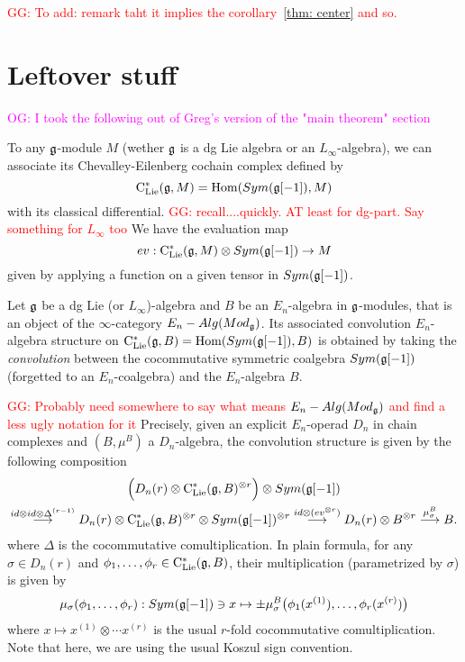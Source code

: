 \documentclass[11pt]{amsart}
\numberwithin{equation}{section}
\def\owen{\textcolor{magenta}{OG: }\textcolor{magenta}}
\def\greg{\textcolor{red}{GG: }\textcolor{red}}
\begin{document}
\greg{To add: remark taht it implies the corollary~\ref{thm: center} and so.}

\section{Leftover stuff}

\owen{I took the following out of Greg's version of the "main theorem" section}

To any $\mathfrak g$-module $M$ (wether $\mathfrak g$ is a dg Lie algebra or an $L_\infty$-algebra), 
we can associate its Chevalley-Eilenberg cochain complex defined 
by 
\begin{equation}
 {\rm C}_{\rm Lie}^*(\mathfrak g, M) = {\rm Hom} (Sym(\mathfrak g[-1]), M)
\end{equation}
with its classical differential. 
\greg{recall....quickly. AT least for dg-part. Say something for $L_\infty$ too}
We have the evaluation map 
\begin{equation}
 \label{eq:defev} ev: {\rm C}_{\rm Lie}^*(\mathfrak g, M) \otimes Sym(\mathfrak g[-1])\to M
\end{equation}
given by applying a function on a given tensor in $Sym(\mathfrak g[-1])$.

\begin{dfn}\label{D:convolutionalgebraCE}Let $\mathfrak g$ be a dg Lie (or $L_\infty$)-algebra and $B$ be an $E_n$-algebra in $\mathfrak g$-modules,
that is an object of the $\infty$-category 
$E_n-Alg(Mod_{\mathfrak g})$. Its associated convolution $E_n$-algebra structure on  ${\rm C}_{\rm Lie}^*(\mathfrak g, B) = {\rm Hom} (Sym(\mathfrak g[-1]), B)$ is obtained by 
 taking the \emph{convolution} between the cocommutative symmetric coalgebra $Sym(\mathfrak g[-1])$ (forgetted to an $E_n$-coalgebra) and the $E_n$-algebra $B$.
\end{dfn}
\greg{Probably need somewhere to say what means $E_n-Alg(Mod_{\mathfrak g})$ and find a less ugly notation for it}
Precisely, given an explicit $E_n$-operad $D_n$ in chain complexes and $(B, \mu^B)$ a $D_n$-algebra, 
the convolution structure is given by the following composition
\begin{multline}
 \Big(D_n(r)\otimes {\rm C}_{\rm Lie}^*(\mathfrak g, B)^{\otimes r} \Big)\otimes Sym(\mathfrak g[-1])\\ \stackrel{id\otimes id \otimes\Delta^{(r-1)}}\longrightarrow 
 D_n(r)\otimes {\rm C}_{\rm Lie}^*(\mathfrak g, B)^{\otimes r} \otimes Sym(\mathfrak g[-1])^{\otimes r} 
 \stackrel{id \otimes (ev^{\otimes r})}\longrightarrow D_n(r)\otimes B^{\otimes r} 
 \stackrel{\mu_\sigma^B}\longrightarrow B.
\end{multline}
where $\Delta$ is the cocommutative comultiplication.
In plain formula,
for any $\sigma \in D_n(r)$ and $\phi_1,\dots, \phi_r \in 
{\rm C}_{\rm Lie}^*(\mathfrak g, B)$, their multiplication (parametrized by $\sigma$) is  given by 
\begin{equation}
 \mu_\sigma (\phi_1,\dots, \phi_r): Sym(\mathfrak g[-1]) \ni x \mapsto \pm \mu^B_{\sigma} \big(\phi_1(x^{(1)}), \dots, \phi_r(x^{(r)})\big)
\end{equation}
where $x\mapsto x^{(1)}\otimes \cdots x^{(r)}$ is the usual $r$-fold cocommutative comultiplication.
Note that here, we are using the usual Koszul sign  convention. 
\end{document}
